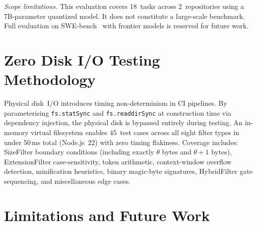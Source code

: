 \documentclass[conference]{IEEEtran}
\begin{document}
\smallskip
\noindent\textit{Scope limitations.}
This evaluation covers 18~tasks across 2~repositories using a
7B-parameter quantized model. It does not constitute a large-scale
benchmark. Full evaluation on SWE-bench~\cite{swebench} with frontier
models is reserved for future work.

\section{Zero Disk I/O Testing Methodology}

Physical disk~I/O introduces timing non-determinism in CI pipelines.
By parameterising \texttt{fs.statSync} and \texttt{fs.readdirSync} at
construction time via dependency injection, the physical disk is
bypassed entirely during testing. An in-memory virtual filesystem
enables 45~test cases across all eight filter types in under 50\,ms
total (Node.js~22) with zero timing flakiness. Coverage includes:
SizeFilter boundary conditions (including exactly $\theta$ bytes and
$\theta{+}1$ bytes), ExtensionFilter case-sensitivity, token
arithmetic, context-window overflow detection, minification heuristics,
binary magic-byte signatures, HybridFilter gate sequencing, and
miscellaneous edge cases.

\section{Limitations and Future Work}
\label{sec:limitations}
\end{document}
